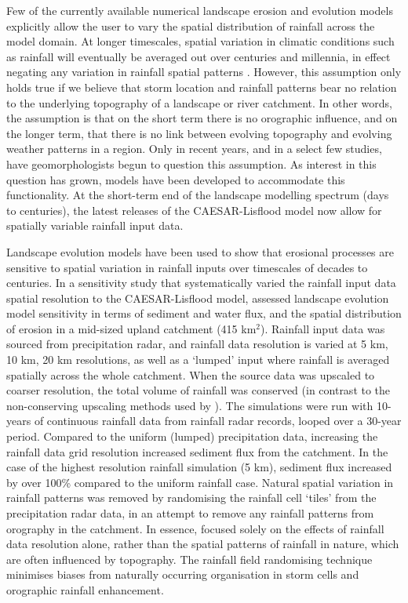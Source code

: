Few of the currently available numerical landscape erosion and evolution models explicitly allow the user to vary the spatial distribution of rainfall across the model domain. At longer timescales, spatial variation in climatic conditions such as rainfall will eventually be averaged out over centuries and millennia, in effect negating any variation in rainfall spatial patterns \citep{solyom2007importance,Tucker2010}. However, this assumption only holds true if we believe that storm location and rainfall patterns bear no relation to the underlying topography of a landscape or river catchment. In other words, the assumption is that on the short term there is no orographic influence, and on the longer term, that there is no link between evolving topography and evolving weather patterns in a region. Only in recent years, and in a select few studies, have geomorphologists begun to question this assumption. As interest in this question has grown, models have been developed to accommodate this functionality. At the short-term end of the landscape modelling spectrum (days to centuries), the latest releases of the CAESAR-Lisflood model \citep{coulthard2017caesarlisflood} now allow for spatially variable rainfall input data.
 
Landscape evolution models have been used to show that erosional processes are sensitive to spatial variation in rainfall inputs over timescales of decades to centuries. In a sensitivity study that systematically varied the rainfall input data spatial resolution to the CAESAR-Lisflood model, \citet{coulthard2016sensitivity} assessed landscape evolution model sensitivity in terms of sediment and water flux, and the spatial distribution of erosion in a mid-sized upland catchment (415 km\(^2\)). Rainfall input data was sourced from precipitation radar, and rainfall data resolution is varied at 5 km, 10 km, 20 km resolutions, as well as a `lumped' input where rainfall is averaged spatially across the whole catchment. When the source data was upscaled to coarser resolution, the total volume of rainfall was conserved (in contrast to the non-conserving upscaling methods used by \citet{nicotina2008impact}). The simulations were run with 10-years of continuous rainfall data from rainfall radar records, looped over a 30-year period. Compared to the uniform (lumped) precipitation data, increasing the rainfall data grid resolution increased sediment flux from the catchment. In the case of the highest resolution rainfall simulation (5 km), sediment flux increased by over 100\% compared to the uniform rainfall case. Natural spatial variation in rainfall patterns was removed by randomising the rainfall cell `tiles' from the precipitation radar data, in an attempt to remove any rainfall patterns from orography in the catchment. In essence, \citet{coulthard2016sensitivity} focused solely on the effects of rainfall data resolution alone, rather than the spatial patterns of rainfall in nature, which are often influenced by topography. The rainfall field randomising technique minimises biases from naturally occurring organisation in storm cells and orographic rainfall enhancement. 

